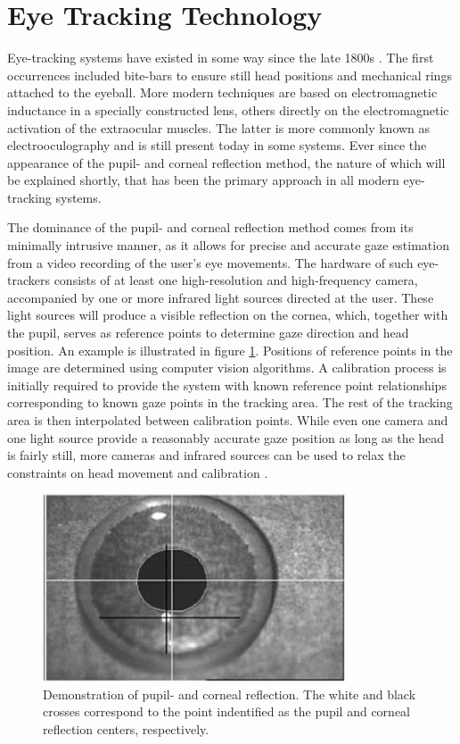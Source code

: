\section{Eye Tracking Technology} \label{sec:bt/ET_tech}

Eye-tracking systems have existed in some way since the late 1800s \cite{holmqvist2011}. The first occurrences included bite-bars to ensure still head positions and mechanical rings attached to the eyeball. More modern techniques are based on electromagnetic inductance in a specially constructed lens, others directly on the electromagnetic activation of the extraocular muscles. The latter is more commonly known as electrooculography and is still present today in some systems. Ever since the appearance of the pupil- and corneal reflection method, the nature of which will be explained shortly, that has been the primary approach in all modern eye-tracking systems. 

The dominance of the pupil- and corneal reflection method comes from its minimally intrusive manner, as it allows for precise and accurate gaze estimation from a video recording of the user's eye movements. The hardware of such eye-trackers consists of at least one high-resolution and high-frequency camera, accompanied by one or more infrared light sources directed at the user. These light sources will produce a visible reflection on the cornea, which, together with the pupil, serves as reference points to determine gaze direction and head position. An example is illustrated in figure \ref{fig:bt_pupil_corneal_reflection}. Positions of reference points in the image are determined using computer vision algorithms. A calibration process is initially required to provide the system with known reference point relationships corresponding to known gaze points in the tracking area. The rest of the tracking area is then interpolated between calibration points. While even one camera and one light source provide a reasonably accurate gaze position as long as the head is fairly still, more cameras and infrared sources can be used to relax the constraints on head movement and calibration \cite{holmqvist2011}. 

\begin{figure}[h]
    \centering
    \includegraphics[width=0.8\textwidth]{figures/bt_pupil_corneal_reflection.png}
    \caption{Demonstration of pupil- and corneal reflection. The white and black crosses correspond to the point indentified as the pupil and corneal reflection centers, respectively.}
    \label{fig:bt_pupil_corneal_reflection}
\end{figure}

